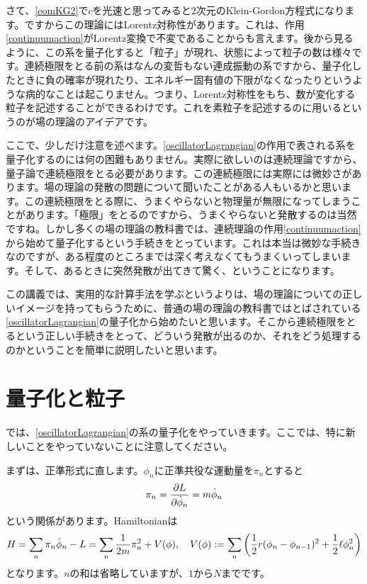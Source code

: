\documentclass[report,paper=a4, fontsize=12pt, line_length=16cm, number_of_lines=33,dvipdfmx]{jlreq}
\numberwithin{equation}{chapter}
\begin{document}
さて、\eqref{eomKG2}で$c$を光速と思ってみると2次元のKlein-Gordon方程式になります。ですからこの理論にはLorentz対称性があります。これは、作用\eqref{continuumaction}がLorentz変換で不変であることからも言えます。後から見るように、この系を量子化すると「粒子」が現れ、状態によって粒子の数は様々です。連続極限をとる前の系はなんの変哲もない連成振動の系ですから、量子化したときに負の確率が現れたり、エネルギー固有値の下限がなくなったりというような病的なことは起こりません。つまり、Lorentz対称性をもち、数が変化する粒子を記述することができるわけです。これを素粒子を記述するのに用いるというのが場の理論のアイデアです。

ここで、少しだけ注意を述べます。\eqref{oscillatorLagrangian}の作用で表される系を量子化するのには何の困難もありません。実際に欲しいのは連続理論ですから、量子論で連続極限をとる必要があります。この連続極限には実際には微妙さがあります。場の理論の発散の問題について聞いたことがある人もいるかと思います。この連続極限をとる際に、うまくやらないと物理量が無限になってしまうことがあります。「極限」をとるのですから、うまくやらないと発散するのは当然ですね。しかし多くの場の理論の教科書では、連続理論の作用\eqref{continuumaction}から始めて量子化するという手続きをとっています。これは本当は微妙な手続きなのですが、ある程度のところまでは深く考えなくてもうまくいってしまいます。そして、あるときに突然発散が出てきて驚く、ということになります。

この講義では、実用的な計算手法を学ぶというよりは、場の理論についての正しいイメージを持ってもらうために、普通の場の理論の教科書ではとばされている\eqref{oscillatorLagrangian}の量子化から始めたいと思います。そこから連続極限をとるという正しい手続きをとって、どういう発散が出るのか、それをどう処理するのかということを簡単に説明したいと思います。

\section{量子化と粒子}
では、\eqref{oscillatorLagrangian}の系の量子化をやっていきます。ここでは、特に新しいことをやっていないことに注意してください。

まずは、正準形式に直します。$\phi_n$に正準共役な運動量を$\pi_n$とすると
\begin{align}
  \pi_n=\pdv{L}{\dot{\phi}_n}=m\dot{\phi}_n
\end{align}
という関係があります。Hamiltonianは
\begin{align}
  H=\sum_{n}\pi_n \dot{\phi}_n-L=\sum_{n}\frac{1}{2m}\pi_n^2+V(\phi),\quad 
  V(\phi):=\sum_n\qty(\frac12 r (\phi_n-\phi_{n-1})^2
  +\frac12 \ell \phi_n^2
  )
\end{align}
となります。$n$の和は省略していますが、$1$から$N$までです。
\end{document}
